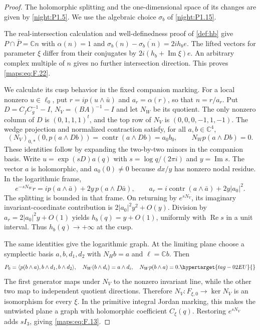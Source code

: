 \documentclass[11pt,a4paper]{article}
\numberwithin{equation}{section}
\theoremstyle{definition}
\begin{document}
\begin{proof}
The holomorphic splitting and the one-dimensional space of its changes are given by \cref{night:P1.5}. We use the algebraic choice $\sigma_b$ of \cref{night:P1.15}.

The real-intersection calculation and well-definedness proof of
\cref{def:hb} give $P\cap\bar P=\mathbb Cn$ with
$\alpha(n)=1$ and
$\sigma_b(n)-\overline{\sigma_b(n)}=2ih_b e$.
The lifted vectors for parameter $\xi$ differ from their
conjugates by $2i(h_b+\operatorname{Im}\xi)e$.
An arbitrary complex multiple of $n$ gives no further
intersection direction. This proves \eqref{maps:eq:F.22}.

We calculate its cusp behavior in the fixed companion marking.
For a local nonzero $u\in\ell_0$, put $r=ip(u\wedge\bar u)$
and $a_r=\alpha(r)$, so that $n=r/a_r$.
Put $D=C_fC_g^{-1}-I$, $N_V=(BA)^{-1}-I$ and let $N_W$ be its
quotient. The only nonzero column of $D$ is
$(0,1,1,1)^t$, and the top row of $N_V$ is
$(0,0,0,-1,1,-1)$. The wedge projection and normalized contraction
satisfy, for all $a,b\in\mathbb C^4$,
\[
 (N_V)_{0,*}(0,p(a\wedge Db))
 =\operatorname{contr}(a\wedge Db)=a_0b_0,
 \qquad N_Wp(a\wedge Db)=0.
\]
These identities follow by expanding the two-by-two minors in
the companion basis. Write $u=\exp(sD)a(q)$ with
$s=\log q/(2\pi i)$ and $y=\operatorname{Im}s$.
The vector $a$ is holomorphic, and $a_0(0)\ne0$ because
$dx/y$ has nonzero nodal residue. In the logarithmic frame,
\[
 e^{-sN_W}r=ip(a\wedge\bar a)+2y\,p(a\wedge D\bar a),
 \qquad
 a_r=i\operatorname{contr}(a\wedge\bar a)+2y|a_0|^2.
\]
The splitting is bounded in that frame. On returning by
$e^{sN_V}$, its imaginary invariant-coordinate contribution is
$2|a_0|^2y^2+O(y)$. Division by
$a_r=2|a_0|^2y+O(1)$ yields
$h_b(q)=y+O(1)$, uniformly with $\operatorname{Re}s$ in a unit
interval. Thus $h_b(q)\to+\infty$ at the cusp.

The same identities give the logarithmic graph. At the limiting
plane choose a symplectic basis $a,b,d_1,d_2$ with $N_Hb=a$
and $\ell=\mathbb Cb$. Then
\begin{equation}
 P_0=\langle p(b\wedge a),b\wedge d_1,b\wedge d_2\rangle,
 \quad N_W(b\wedge d_i)=a\wedge d_i,
 \quad N_Wp(b\wedge a)=0.
 \hypertarget{tag-02EU}{}\label{maps:eq:F.23}
\end{equation}
The first generator maps under $N_V$ to the nonzero invariant
line, while the other two map to independent quotient directions.
Therefore $N_V:F_{\xi,0}\to\ker N_V$ is an isomorphism for
every $\xi$. In the primitive integral Jordan marking, this
makes the untwisted plane a graph with holomorphic coefficient
$C_\xi(q)$. Restoring $e^{sN_V}$ adds $sI_3$, giving
\eqref{maps:eq:F.13}.


\end{proof}
\end{document}
